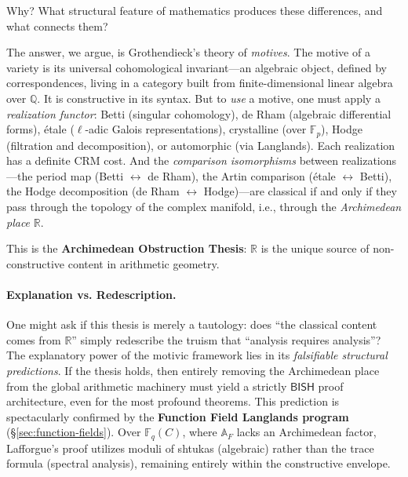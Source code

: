 \documentclass[11pt,a4paper]{article}
\theoremstyle{plain}
\theoremstyle{definition}
\newcommand{\BISH}{\textsf{BISH}}
\newcommand{\Q}{\mathbb{Q}}
\newcommand{\R}{\mathbb{R}}
\newcommand{\F}{\mathbb{F}}
\newcommand{\A}{\mathbb{A}}
\begin{document}
Why? What structural feature of mathematics produces these differences, and what connects them?

The answer, we argue, is Grothendieck's theory of \emph{motives}. The motive of a variety is its universal cohomological invariant---an algebraic object, defined by correspondences, living in a category built from finite-dimensional linear algebra over $\Q$. It is constructive in its syntax. But to \emph{use} a motive, one must apply a \emph{realization functor}: Betti (singular cohomology), de Rham (algebraic differential forms), \'etale ($\ell$-adic Galois representations), crystalline (over $\F_p$), Hodge (filtration and decomposition), or automorphic (via Langlands). Each realization has a definite CRM cost. And the \emph{comparison isomorphisms} between realizations---the period map (Betti $\leftrightarrow$ de Rham), the Artin comparison (\'etale $\leftrightarrow$ Betti), the Hodge decomposition (de Rham $\leftrightarrow$ Hodge)---are classical if and only if they pass through the topology of the complex manifold, i.e., through the \emph{Archimedean place} $\R$.

This is the \textbf{Archimedean Obstruction Thesis}: $\R$ is the unique source of non-constructive content in arithmetic geometry.

\paragraph{Explanation vs. Redescription.} One might ask if this thesis is merely a tautology: does ``the classical content comes from $\R$'' simply redescribe the truism that ``analysis requires analysis''? The explanatory power of the motivic framework lies in its \emph{falsifiable structural predictions}. If the thesis holds, then entirely removing the Archimedean place from the global arithmetic machinery must yield a strictly $\BISH$ proof architecture, even for the most profound theorems. This prediction is spectacularly confirmed by the \textbf{Function Field Langlands program} (\S\ref{sec:function-fields}). Over $\F_q(C)$, where $\A_F$ lacks an Archimedean factor, Lafforgue's proof utilizes moduli of shtukas (algebraic) rather than the trace formula (spectral analysis), remaining entirely within the constructive envelope.
\end{document}
